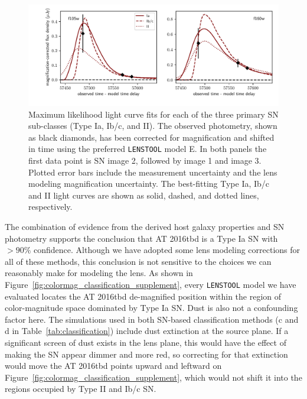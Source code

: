 \documentclass[12pt]{article}
\def\SNABC{AT 2016tbd\xspace}
\def\lenstool{{\tt LENSTOOL}\xspace}
\begin{document}
{\begin{figure}
    \centering
    \includegraphics[width=\textwidth]{Paper/Figures/snRequiem_stardust_classify_alltypes.pdf}
    \caption{Maximum likelihood light curve fits for each of the three primary SN sub-classes (Type Ia, Ib/c, and II).  The observed photometry, shown as black diamonds, has been corrected for magnification and shifted in time using the preferred \lenstool model E. In both panels the first data point is SN image 2, followed by image 1 and image 3. Plotted error bars include the measurement uncertainty and the lens modeling magnification uncertainty.  The best-fitting Type Ia, Ib/c and II light curves are shown as solid, dashed, and dotted lines, respectively. 
    \label{fig:classification_lightcurves}
    }
\end{figure}

The combination of evidence from the derived host galaxy properties  and SN photometry supports the conclusion that \SNABC  is  a Type Ia SN with $>90\%$ confidence.  Although we have adopted some lens modeling corrections for all of these methods, this conclusion is not sensitive to the choices we can reasonably make for modeling the lens.  As shown in Figure~\ref{fig:colormag_classification_supplement}, every  \lenstool model we have evaluated locates the \SNABC  de-magnified position within the region of color-magnitude space dominated by Type Ia SN. Dust is also not a confounding factor here. 
The simulations used in both SN-based classification methods (c and d in Table~\ref{tab:classification}) include dust extinction at the source plane.  If a significant screen of dust exists in the lens plane, this would have the effect of making the SN appear dimmer and more red, so correcting for that extinction would move the \SNABC points upward and leftward on Figure~\ref{fig:colormag_classification_supplement}, which would not shift it into the regions occupied by Type II and Ib/c SN. 


}
\end{document}
